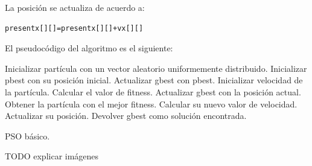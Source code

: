 \documentclass[a4paper,12pt,titlepage]{article}
\begin{document}
La posición se actualiza de acuerdo a:

\begin{lstlisting}
presentx[][]=presentx[][]+vx[][]
\end{lstlisting}

El pseudocódigo del algoritmo es el siguiente:
\newpage

\begin{algorithm}[!ht]
	\begin{algorithmic}[1]
		\STATE Inicializar partícula con un vector aleatorio uniformemente distribuido.
		\STATE Inicializar pbest con su posición inicial.
			\STATE Actualizar gbest con pbest.
		\ENDIF
		\STATE Inicializar velocidad de la partícula.
	\ENDFOR
	\REPEAT 
			\STATE Calcular el valor de fitness.
				\STATE Actualizar gbest con la posición actual.
			\ENDIF
		\ENDFOR
		\STATE Obtener la partícula con el mejor fitness.
			\STATE Calcular su nuevo valor de velocidad.
			\STATE Actualizar su posición.
		\ENDFOR		
	\STATE Devolver gbest como solución encontrada.
	\end{algorithmic}
\caption{PSO básico.}
\label{alg:algoritmoRaro}
\end{algorithm}

TODO explicar imágenes
\newpage
\end{document}
